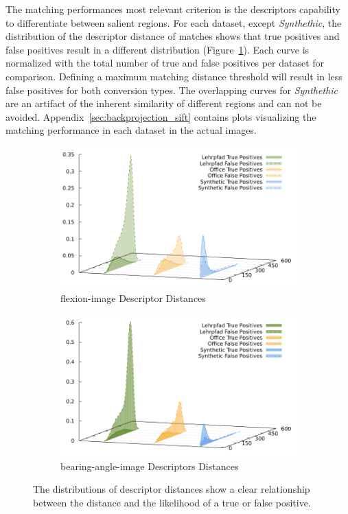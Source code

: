 The matching performances most relevant criterion is the descriptors capability to differentiate between salient regions.
For each dataset, except \emph{Synthethic}, the distribution of the descriptor distance of matches shows that true positives and false positives result in a different distribution (Figure~\ref{fig:sift_descriptor_distance}).
Each curve is normalized with the total number of true and false positives per dataset for comparison.
Defining a maximum matching distance threshold will result in less false positives for both conversion types.
The overlapping curves for \emph{Synthethic} are an artifact of the inherent similarity of different regions and can not be avoided.
Appendix~\ref{sec:backprojection_sift} contains plots visualizing the matching performance in each dataset in the actual images.
\begin{figure}[htp]
\begin{subfigure}[t]{0.45\linewidth}
    \includegraphics[width=\linewidth]{chapter06/results/SIFT/flexion/descriptor_distances.pdf}%
    \caption{\gls{flexion-image} Descriptor Distances}
\end{subfigure}\quad
\begin{subfigure}[t]{0.45\linewidth}
    \includegraphics[width=\linewidth]{chapter06/results/SIFT/bearing/descriptor_distances.pdf}%
    \caption{\gls{bearing-angle-image} Descriptors Distances}
\end{subfigure}
\caption{The distributions of descriptor distances show a clear relationship between the distance and the likelihood of a true or false positive.}\label{fig:sift_descriptor_distance}
\end{figure}
